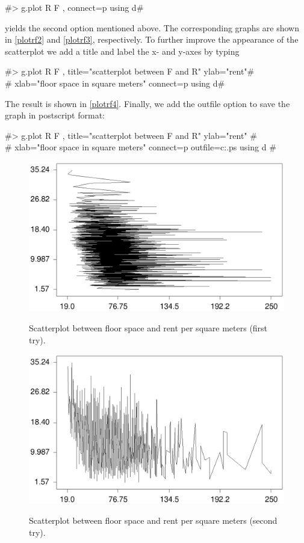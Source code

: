 #> g.plot R F , connect=p using d#

yields the second option mentioned above. The corresponding graphs
are shown in \autoref{plotrf2} and \autoref{plotrf3},
respectively. To further improve the appearance of the scatterplot
we add a title and label the x- and y-axes
by typing

#> g.plot R F , title="scatterplot between F and R" ylab="rent"# \\
#  xlab="floor space in square meters" connect=p using d#

The result is shown in \autoref{plotrf4}.
Finally, we add the outfile option to save the graph in postscript format:

#> g.plot R F , title="scatterplot between F and R" ylab="rent" #\\
#  xlab="floor space in square meters" connect=p outfile=c:\temp\plotrf.ps using d #

\begin{figure}[ht]
\begin{center}
\includegraphics[scale=0.7]{grafiken/plotrf1.ps}
{\em\caption{ \label{plotrf1} Scatterplot between floor space and
rent per square meters (first try).}}
\end{center}
\end{figure}

\begin{figure}[ht]
\begin{center}
\includegraphics[scale=0.7]{grafiken/plotrf2.ps}
{\em\caption{ \label{plotrf2} Scatterplot between floor space and
rent per square meters (second try).}}
\end{center}
\end{figure}

